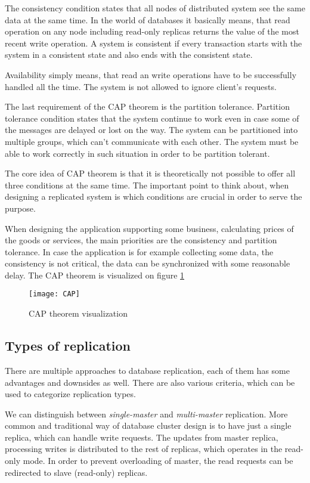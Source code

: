 \documentclass[
  digital, %
  twoside, %
  table,   %
  lof,     %
  lot,     %
]{fithesis3}
\begin{document}
The consistency condition states that all nodes of distributed system see the same data at the same time. In the world of databases it basically means, that read operation on any node including read-only replicas returns the value of the most recent write operation. A system is consistent if every transaction starts with the system in a consistent state and also ends with the consistent state.

Availability simply means, that read an write operations have to be successfully handled all the time. The system is not allowed to ignore client's requests.

The last requirement of the CAP theorem is the partition tolerance. Partition tolerance condition states that the system continue to work even in case some of the messages are delayed or lost on the way. The system can be partitioned into multiple groups, which can't communicate with each other. The system must be able to work correctly in such situation in order to be partition tolerant.

The core idea of CAP theorem is that it is theoretically not possible to offer all three conditions at the same time. The important point to think about, when designing a replicated system is which conditions are crucial in order to serve the purpose.

When designing the application supporting some business, calculating prices of the goods or services, the main priorities are the  consistency and partition tolerance. In case the application is for example collecting some data, the consistency is not critical, the data can be synchronized with some reasonable delay. The CAP theorem is visualized on figure \ref{fig:cap}

\begin{figure}[H]
\caption{CAP theorem visualization}
\centering
\texttt{[image: CAP]}
\label{fig:cap}
\end{figure}

\subsection{Types of replication} \label{sec:types_of_replication}
There are multiple approaches to database replication, each of them has some advantages and downsides as well. There are also various criteria, which can be used to categorize replication types.

We can distinguish between \textit{single-master} and  \textit{multi-master} replication. More common and traditional way of database cluster design is to have just a single replica, which can handle write requests. The updates from master replica, processing writes is distributed to the rest of replicas, which operates in the read-only mode. In order to prevent overloading of master, the read requests can be redirected to slave (read-only) replicas.
\end{document}
